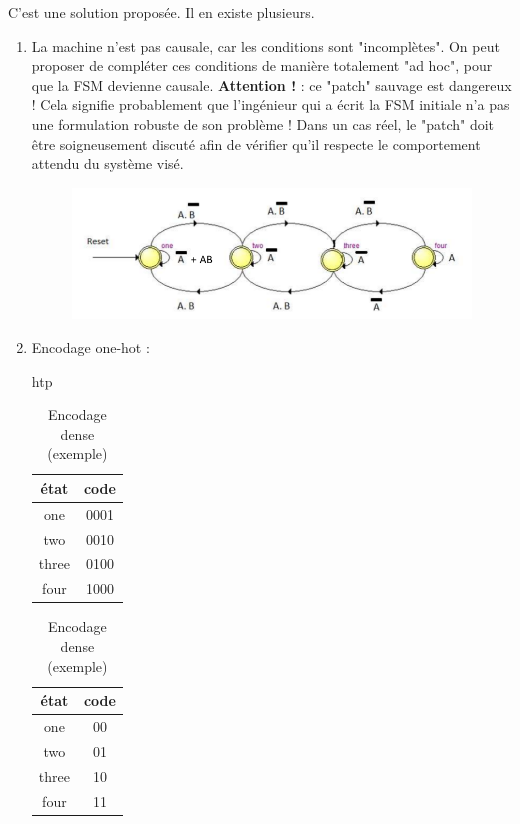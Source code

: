 \documentclass[a4paper,11pt]{article}
\begin{document}
C'est une solution proposée. Il en existe plusieurs.

\begin{enumerate}
  \item La machine n'est pas causale, car les conditions sont "incomplètes". On peut proposer de compléter ces conditions de manière totalement "ad hoc", pour que
  la FSM devienne causale. \textbf{Attention !} : ce "patch" sauvage est \textrm{dangereux} ! Cela signifie probablement que l'ingénieur qui a écrit la FSM initiale
  n'a pas une formulation robuste de son problème ! Dans un cas réel, le "patch" doit être soigneusement discuté afin de vérifier qu'il respecte le comportement attendu du système visé.

  \begin{figure}[!h]
    \begin{center}
      \includegraphics[scale=0.5]{./figures/correction_automate.png}
    \end{center}
    \label{solution}
  \end{figure}

  \item Encodage one-hot :
\begin{table}{htp}
  \caption{Encodage one-hot}
  \begin{tabular}{c|c}
    état  & code \\ \hline
    one   & 0001 \\
    two   & 0010 \\
    three & 0100 \\
    four  & 1000 \\
  \end{tabular}

  \caption{Encodage dense (exemple)}
  \begin{tabular}{c|c}
    état  & code \\ \hline
    one   & 00 \\
    two   & 01 \\
    three & 10 \\
    four  & 11 \\
  \end{tabular}


\end{table}
\end{enumerate}
\end{document}
